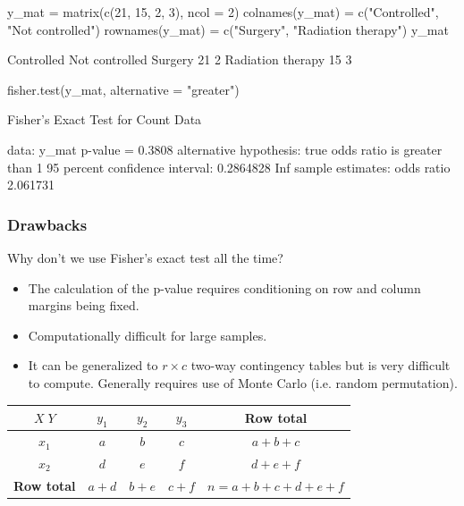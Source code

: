 \documentclass[a4paper]{article}
\begin{document}
\begin{Schunk}
\begin{Sinput}
y_mat = matrix(c(21, 15, 2, 3), ncol = 2)
colnames(y_mat) = c("Controlled", "Not controlled")
rownames(y_mat) = c("Surgery", "Radiation therapy")
y_mat
\end{Sinput}
\begin{Soutput}
                  Controlled Not controlled
Surgery                   21              2
Radiation therapy         15              3
\end{Soutput}
\begin{Sinput}
fisher.test(y_mat, alternative = "greater")
\end{Sinput}
\begin{Soutput}

	Fisher's Exact Test for Count Data

data:  y_mat
p-value = 0.3808
alternative hypothesis: true odds ratio is greater than 1
95 percent confidence interval:
 0.2864828       Inf
sample estimates:
odds ratio 
  2.061731 
\end{Soutput}
\end{Schunk}
\subsubsection{Drawbacks}
Why don't we use Fisher's exact test all the time?
\begin{itemize}
	\item The calculation of the p-value requires conditioning on row and column margins being fixed.
	\item Computationally difficult for large samples.
	\item It can be generalized to \( r \times c \) two-way contingency tables but is very difficult to compute. Generally requires use of Monte Carlo (i.e. random permutation).
\end{itemize}
\begin{table}[H]
	\centering
	\begin{tabular}{@{}c|ccc|c@{}}
	\toprule
	\( X \; Y \) 	   & \( y_1 \)   & \( y_2 \)   & \( y_3 \)   & \textbf{Row total}    \\ \midrule
	\( x_1 \)          & \( a \)     & \( b \)     & \( c \)     & \( a + b + c \)       \\
	\( x_2 \)          & \( d \)     & \( e \)     & \( f \)     & \( d + e + f \)       \\ \midrule
	\textbf{Row total} & \( a + d \) & \( b + e \) & \( c + f \) & \( n = a+b+c+d+e+f \) \\ \bottomrule
	\end{tabular}
\end{table}
\end{document}
